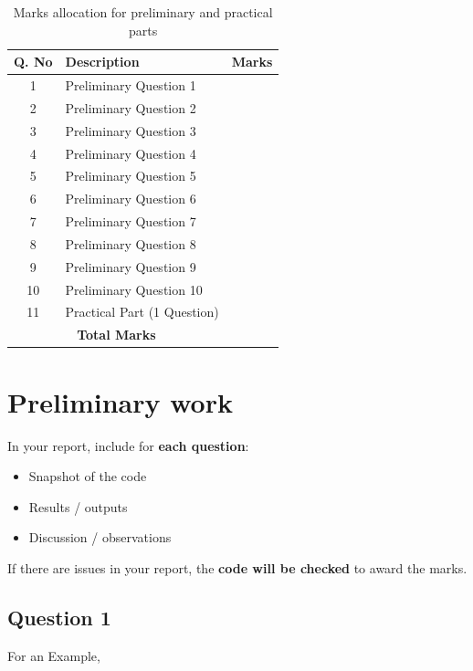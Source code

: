 \documentclass[12pt,a4paper]{article}
\begin{document}
\begin{table}[H]
\centering
\renewcommand{\arraystretch}{2.5} %
\begin{tabular}{|c|l|c|}
\hline
\textbf{Q. No} & \textbf{Description} & \textbf{Marks} \\
\hline
1 & Preliminary Question 1 &  \\
2 & Preliminary Question 2 & \\
3 & Preliminary Question 3 &  \\
4 & Preliminary Question 4 &  \\
5 & Preliminary Question 5 &  \\
6 & Preliminary Question 6 &  \\
7 & Preliminary Question 7 &  \\
8 & Preliminary Question 8 &  \\
9 & Preliminary Question 9 &  \\
10 & Preliminary Question 10 &  \\
\hline
11 & Practical Part (1 Question) &  \\
\hline
\multicolumn{2}{|c|}{\textbf{Total Marks}} & \textbf{} \\
\hline
\end{tabular}
\caption{Marks allocation for preliminary and practical parts}
\label{tab:marks_per_question}
\end{table}

\newpage{}




\section{Preliminary work}

In your report, include for \textbf{each question}:
\begin{itemize}
    \item Snapshot of the code
    \item Results / outputs
    \item Discussion / observations
\end{itemize}

If there are issues in your report, the \textbf{code will be checked} to award the marks.

\subsection{Question 1}
For an Example,
\end{document}
